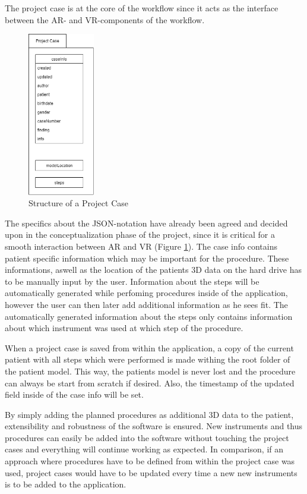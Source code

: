 The project case is at the core of the workflow since it acts as the interface between the AR- and VR-components of the workflow.

\begin{figure}[ht]
    \centering
    \includegraphics[width=110px]{images/implementation/project_case.png}
    \caption{\label{fig::ImplementationProjectCase}Structure of a Project Case}
\end{figure}

The specifics about the JSON-notation have already been agreed and decided upon in the conceptualization phase of the project, since it is critical for a smooth interaction between AR and VR (Figure \ref{fig::ImplementationProjectCase}). 
The case info contains patient specific information which may be important for the procedure.
These informations, aswell as the location of the patients 3D data on the hard drive has to be manually input by the user.
Information about the steps will be automatically generated while perfoming procedures inside of the application, however the user can then later add additional information as he sees fit.
The automatically generated information about the steps only contains information about which instrument was used at which step of the procedure.

When a project case is saved from within the application, a copy of the current patient with all steps which were performed is made withing the root folder of the patient model.
This way, the patients model is never lost and the procedure can always be start from scratch if desired.
Also, the timestamp of the updated field inside of the case info will be set.

By simply adding the planned procedures as additional 3D data to the patient, extensibility and robustness of the software is ensured.
New instruments and thus procedures can easily be added into the software without touching the project cases and everything will continue working as expected.
In comparison, if an approach where procedures have to be defined from within the project case was used, project cases would have to be updated every time a new new instruments is to be added to the application.